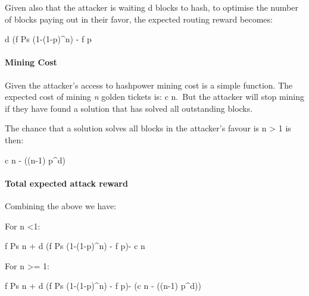 \documentclass[
]{article}
\begin{document}
Given also that the attacker is waiting d blocks to hash, to optimise
the number of blocks paying out in their favor, the expected routing
reward becomes:

d \cdot (f \cdot Ps \cdot (1-(1-p)\^{}n) - f \cdot p

\hypertarget{mining-cost}{%
\paragraph{Mining Cost}\label{mining-cost}}

Given the attacker's access to hashpower mining cost is a simple
function. The expected cost of mining \emph{n} golden tickets is: c
\cdot n.~But the attacker will stop mining if they have found a solution
that has solved all outstanding blocks.

The chance that a solution solves all blocks in the attacker's favour is
n \textgreater{} 1 is then:

c \cdot n - ((n-1) \cdot p\^{}d)

\hypertarget{total-expected-attack-reward}{%
\paragraph{Total expected attack
reward}\label{total-expected-attack-reward}}

Combining the above we have:

For n \textless1:

f \cdot Ps \cdot n + d \cdot (f \cdot Ps \cdot (1-(1-p)\^{}n) - f
\cdot p)- c \cdot n

For n \textgreater= 1:

f \cdot Ps \cdot n + d \cdot (f \cdot Ps \cdot (1-(1-p)\^{}n) - f
\cdot p)- (c \cdot n - ((n-1) \cdot p\^{}d))
\end{document}

